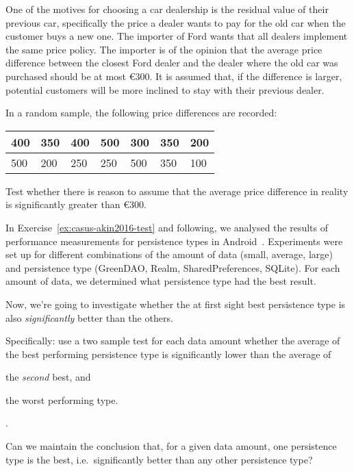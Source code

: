\begin{exercise}
  \label{ex:price-difference-cars}
  
  One of the motives for choosing a car dealership is the residual value of their previous car, specifically the price a dealer wants to pay for the old car when the customer buys a new one. The importer of Ford wants that all dealers implement the same price policy. The importer is of the opinion that the average price difference between the closest Ford dealer and the dealer where the old car was purchased should be at most \euro{300}. It is assumed that, if the difference is larger, potential customers will be more inclined to stay with their previous dealer.
  
  In a random sample, the following price differences are recorded:
  
  \begin{center}
    \begin{tabular}{|l|l|l|l|l|l|l|}
      \hline
      400 & 350 & 400 & 500 & 300 & 350 & 200 \\ \hline
      500 & 200 & 250 & 250 & 500 & 350 & 100 \\ \hline
    \end{tabular}
  \end{center}

  Test whether there is reason to assume that the average price difference in reality is significantly greater than \euro{300}.
  
\end{exercise}

\begin{exercise}
  \label{ex:casus-akin2016-test}
  
  In Exercise~\ref{ex:casus-akin2016-test} and following, we analysed the results of performance measurements for persistence types in Android~\autocite{Akin2016}. Experiments were set up for different combinations of the amount of data (small, average, large) and persistence type (GreenDAO, Realm, SharedPreferences, SQLite). For each amount of data, we determined what persistence type had the best result.
  
  Now, we're going to investigate whether the at first sight best persistence type is also \emph{significantly} better than the others.
  
  Specifically: use a two sample test for each data amount whether the average of the best performing persistence type is significantly lower than the average of \begin{inparaenum}[(i)] \item the \emph{second} best, and \item the worst performing type.\end{inparaenum}.
  
  Can we maintain the conclusion that, for a given data amount, one persistence type is the best, i.e.~significantly better than any other persistence type?
\end{exercise}

